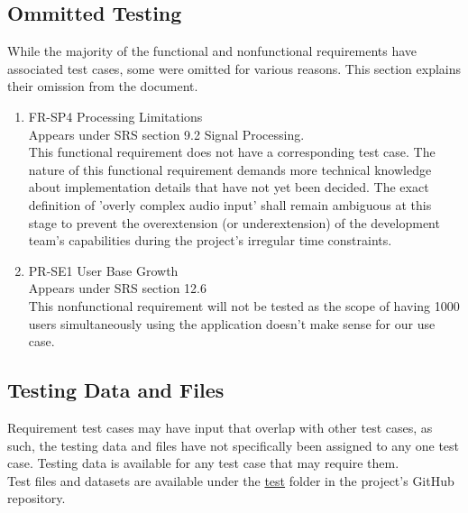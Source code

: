 \documentclass[12pt, titlepage]{article}
\begin{document}
\subsection{Ommitted Testing}
While the majority of the functional and nonfunctional requirements have associated test cases, 
some were omitted for various reasons. This section explains their omission from the document. 
\begin{enumerate}
  \item FR-SP4 Processing Limitations \\
  Appears under SRS section 9.2 Signal Processing. \\
  This functional requirement does not
  have a corresponding test case. The nature of this functional requirement demands more technical knowledge
  about implementation details that have not yet been decided. The exact definition of 'overly complex audio input' shall
  remain ambiguous at this stage to prevent the overextension (or underextension) of the development team's
  capabilities during the project's irregular time constraints.\\
  \item PR-SE1 User Base Growth\\
  Appears under SRS section 12.6\\
  This nonfunctional requirement will not be tested as the scope of having 1000 users simultaneously using the application doesn't make sense
  for our use case.\\
\end{enumerate}
\subsection{Testing Data and Files}
Requirement test cases may have input that overlap with other test cases, as such, the testing data and files have not specifically been
assigned to any one test case. Testing data is available for any test case that may require them. \\
Test files and datasets are available under the \href{https://github.com/emilyperica/ScoreGen/tree/9203b49bd6b54247517192c6b1992f5fa952478f/test}{test} folder
in the project's GitHub repository. \\
\newpage

\renewcommand\refname{Appendix C: References}



\end{document}
